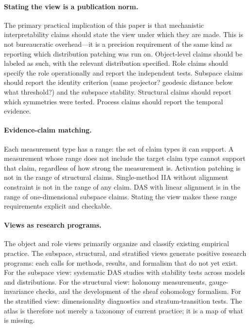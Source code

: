 \documentclass[11pt]{article}
\theoremstyle{remark}
\begin{document}
\paragraph{Stating the view is a publication norm.}
The primary practical implication of this paper is that mechanistic
interpretability claims should state the view under which they are made.
This is not bureaucratic overhead---it is a precision requirement of
the same kind as reporting which distribution patching was run on.
Object-level claims should be labeled as such, with the relevant
distribution specified.  Role claims should specify the role operationally
and report the independent tests.  Subspace claims should report the
identity criterion (same projector? geodesic distance below what
threshold?) and the subspace stability.  Structural claims should report
which symmetries were tested.  Process claims should report the
temporal evidence.

\paragraph{Evidence-claim matching.}
Each measurement type has a range: the set of claim types it can support.
A measurement whose range does not include the target claim type cannot
support that claim, regardless of how strong the measurement is.
Activation patching is not in the range of structural claims.
Single-method IIA without alignment constraint is not in the range of
any claim.  DAS with linear alignment is in the range of
one-dimensional subspace claims.  Stating the view makes these
range requirements explicit and checkable.

\paragraph{Views as research programs.}
The object and role views primarily organize and classify existing
empirical practice.  The subspace, structural, and stratified views
generate positive research programs: each calls for methods, results,
and formalism that do not yet exist.  For the subspace view: systematic
DAS studies with stability tests across models and distributions.  For
the structural view: holonomy measurements, gauge-invariance checks,
and the development of the sheaf cohomology formalism.  For the
stratified view: dimensionality diagnostics and stratum-transition
tests.  The atlas is therefore not merely a taxonomy of current
practice; it is a map of what is missing.
\end{document}
